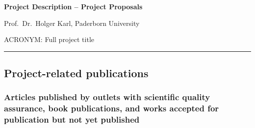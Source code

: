 \documentclass{scrartcl}
\newcommand{\applicants}{Prof.\ Dr.\ Holger Karl, Paderborn University}
\newcommand{\projectshort}{ACRONYM}
\newcommand{\projectfull}{Full project title}
\newcommand{\project}{\projectshort: \projectfull}
\begin{document}
\pagestyle{empty}
\setcounter{page}{0}



\cleardoublepage
\pagestyle{plain}


{\raggedright{} \normalsize \bfseries 
	Project Description -- Project Proposals \par
	\applicants{} \par
	\project{} \par
	\rule{\textwidth}{0.5pt} \par
}






\subsection{Project-related publications}

\newrefcontext[labelprefix=O]

\subsubsection{Articles published by outlets with scientific quality assurance, book publications, and works accepted for publication but not yet published}
\printbibliography[notcategory=nonreviewed, notcategory=own_general, category=own_project, heading=none]
\end{document}
